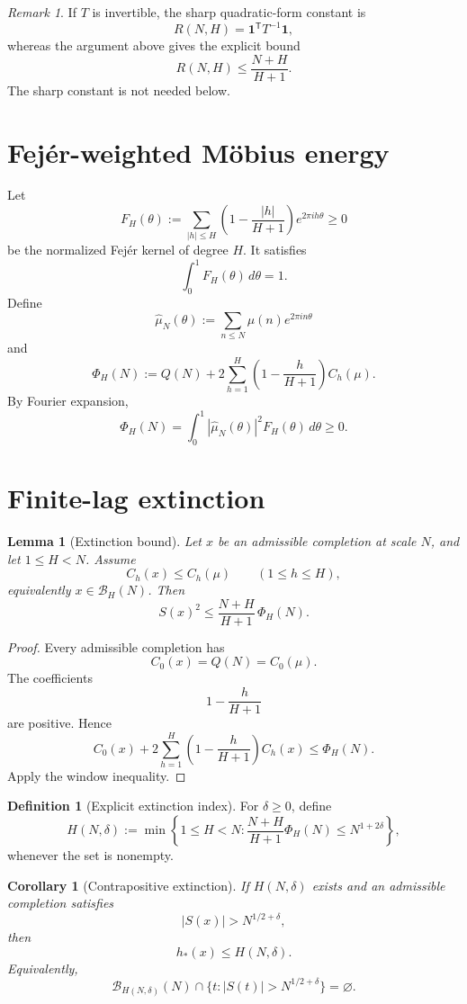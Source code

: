 \documentclass[11pt]{article}
\newtheorem{lemma}[theorem]{Lemma}
\newtheorem{corollary}[theorem]{Corollary}
\theoremstyle{definition}
\newtheorem{definition}[theorem]{Definition}
\theoremstyle{remark}
\newtheorem{remark}[theorem]{Remark}
\newcommand{\BH}{\mathcal B}
\begin{document}
\begin{remark}
If $T$ is invertible, the sharp quadratic-form constant is
\[
R(N,H)=\mathbf1^{\mathsf T}T^{-1}\mathbf1,
\]
whereas the argument above gives the explicit bound
\[
R(N,H)\le\frac{N+H}{H+1}.
\]
The sharp constant is not needed below.
\end{remark}

\section{Fej\'er-weighted M\"obius energy}

Let
\[
F_H(\theta)
:=\sum_{|h|\le H}
\left(1-\frac{|h|}{H+1}\right)e^{2\pi i h\theta}
\ge0
\]
be the normalized Fej\'er kernel of degree $H$.  It satisfies
\[
\int_0^1F_H(\theta)\,d\theta=1.
\]
Define
\[
\widehat\mu_N(\theta):=\sum_{n\le N}\mu(n)e^{2\pi i n\theta}
\]
and
\[
\boxed{
\Phi_H(N)
:=Q(N)+2\sum_{h=1}^{H}
\left(1-\frac{h}{H+1}\right)C_h(\mu).
}
\]
By Fourier expansion,
\[
\Phi_H(N)
=
\int_0^1|\widehat\mu_N(\theta)|^2F_H(\theta)\,d\theta
\ge0.
\]

\section{Finite-lag extinction}

\begin{lemma}[Extinction bound]
Let $x$ be an admissible completion at scale $N$, and let $1\le H<N$.  Assume
\[
C_h(x)\le C_h(\mu)
\qquad(1\le h\le H),
\]
equivalently $x\in\BH_H(N)$.  Then
\[
\boxed{
S(x)^2\le
\frac{N+H}{H+1}\,\Phi_H(N).
}
\]
\end{lemma}

\begin{proof}
Every admissible completion has
\[
C_0(x)=Q(N)=C_0(\mu).
\]
The coefficients
\[
1-\frac{h}{H+1}
\]
are positive.  Hence
\[
C_0(x)+2\sum_{h=1}^{H}
\left(1-\frac{h}{H+1}\right)C_h(x)
\le
\Phi_H(N).
\]
Apply the window inequality.
\end{proof}

\begin{definition}[Explicit extinction index]
For $\delta\ge0$, define
\[
\boxed{
H(N,\delta)
:=\min\left\{
1\le H<N:
\frac{N+H}{H+1}\Phi_H(N)
\le N^{1+2\delta}
\right\},
}
\]
whenever the set is nonempty.
\end{definition}

\begin{corollary}[Contrapositive extinction]
If $H(N,\delta)$ exists and an admissible completion satisfies
\[
|S(x)|>N^{1/2+\delta},
\]
then
\[
\boxed{\quad h_*(x)\le H(N,\delta).\quad}
\]
Equivalently,
\[
\boxed{
\BH_{H(N,\delta)}(N)
\cap
\{t:|S(t)|>N^{1/2+\delta}\}
=\varnothing.
}
\]
\end{corollary}
\end{document}
